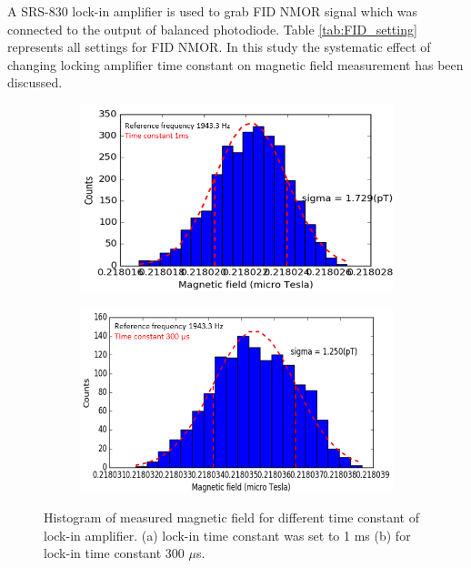 \begin{itemize}
  A SRS-830 lock-in amplifier is used to grab FID NMOR signal which was connected to the output of balanced photodiode. Table \ref{tab:FID_setting} represents all settings for FID NMOR. In this study the systematic effect of changing locking amplifier time constant on magnetic field measurement has been discussed.
   \begin{figure}
    \centering
    \begin{subfigure}[b]{0.45\textwidth}
        \centering
        \includegraphics[width=\textwidth]{figures/time_constant}
        \caption{}
        \label{fig:time constant long}
    \end{subfigure}
    \hfill
    \begin{subfigure}[b]{0.45\textwidth}
        \centering
        \includegraphics[width=\textwidth]{figures/time_constant_300micro_sec}
        \caption{}
        \label{fig:time constant short}
    \end{subfigure}
    \caption{Histogram of measured magnetic field for different time constant of lock-in amplifier. (a) lock-in time constant was set to 1 ms (b) for lock-in time constant 300 $\mu$s. \label{fig:different time constant} }
\end{figure}
  

\end{itemize}
